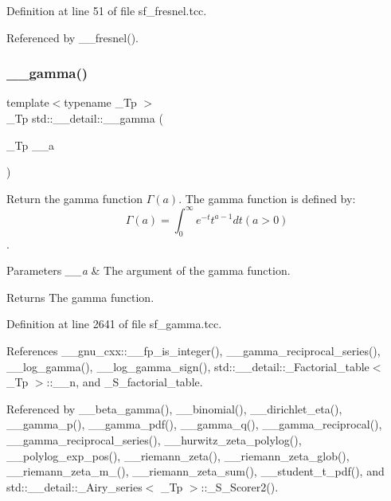 Definition at line 51 of file sf\+\_\+fresnel.\+tcc.



Referenced by \+\_\+\+\_\+fresnel().

\mbox{\label{namespacestd_1_1____detail_a178e0b2cc0ae66b7d958e837da4fe4c1}} 
\subsubsection{\texorpdfstring{\+\_\+\+\_\+gamma()}{\_\_gamma()}\hspace{0.1cm}{\footnotesize\ttfamily [1/2]}}
{\footnotesize\ttfamily template$<$typename \+\_\+\+Tp $>$ \\
\+\_\+\+Tp std\+::\+\_\+\+\_\+detail\+::\+\_\+\+\_\+gamma (\begin{DoxyParamCaption}\item[{\+\_\+\+Tp}]{\+\_\+\+\_\+a }\end{DoxyParamCaption})}



Return the gamma function $ \Gamma(a) $. The gamma function is defined by\+: \[ \Gamma(a) = \int_0^\infty e^{-t}t^{a-1}dt (a > 0) \]. 


\begin{DoxyParams}{Parameters}
{\em \+\_\+\+\_\+a} & The argument of the gamma function. \\
\hline
\end{DoxyParams}
\begin{DoxyReturn}{Returns}
The gamma function. 
\end{DoxyReturn}


Definition at line 2641 of file sf\+\_\+gamma.\+tcc.



References \+\_\+\+\_\+gnu\+\_\+cxx\+::\+\_\+\+\_\+fp\+\_\+is\+\_\+integer(), \+\_\+\+\_\+gamma\+\_\+reciprocal\+\_\+series(), \+\_\+\+\_\+log\+\_\+gamma(), \+\_\+\+\_\+log\+\_\+gamma\+\_\+sign(), std\+::\+\_\+\+\_\+detail\+::\+\_\+\+Factorial\+\_\+table$<$ \+\_\+\+Tp $>$\+::\+\_\+\+\_\+n, and \+\_\+\+S\+\_\+factorial\+\_\+table.



Referenced by \+\_\+\+\_\+beta\+\_\+gamma(), \+\_\+\+\_\+binomial(), \+\_\+\+\_\+dirichlet\+\_\+eta(), \+\_\+\+\_\+gamma\+\_\+p(), \+\_\+\+\_\+gamma\+\_\+pdf(), \+\_\+\+\_\+gamma\+\_\+q(), \+\_\+\+\_\+gamma\+\_\+reciprocal(), \+\_\+\+\_\+gamma\+\_\+reciprocal\+\_\+series(), \+\_\+\+\_\+hurwitz\+\_\+zeta\+\_\+polylog(), \+\_\+\+\_\+polylog\+\_\+exp\+\_\+pos(), \+\_\+\+\_\+riemann\+\_\+zeta(), \+\_\+\+\_\+riemann\+\_\+zeta\+\_\+glob(), \+\_\+\+\_\+riemann\+\_\+zeta\+\_\+m\+\_(), \+\_\+\+\_\+riemann\+\_\+zeta\+\_\+sum(), \+\_\+\+\_\+student\+\_\+t\+\_\+pdf(), and std\+::\+\_\+\+\_\+detail\+::\+\_\+\+Airy\+\_\+series$<$ \+\_\+\+Tp $>$\+::\+\_\+\+S\+\_\+\+Scorer2().

